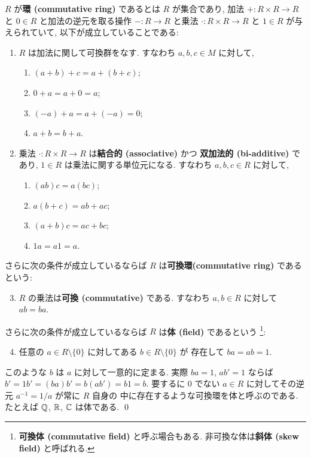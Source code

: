 \documentclass[12pt,twoside]{jarticle}
\begin{document}
\begin{definition}[可換環と体]
  \label{def:ring-field}
  $R$ が{\bf 環 (commutative ring)} であるとは $R$ が集合であり,
  加法 $+:R\times R\to R$
  と $0\in R$
  と加法の逆元を取る操作 $-:R\to R$
  と乗法 $\cdot:R\times R\to R$
  と $1\in R$ が与えられていて,
  以下が成立していることである:
  \begin{enumerate}
  \item $R$ は加法に関して可換群をなす. すなわち $a,b,c\in M$ に対して,
    \begin{enumerate}
    \item $(a + b) + c = a + (b + c)$;
    \item $0 + a = a + 0 = a$;
    \item $(-a) + a = a + (-a) = 0$;
    \item $a + b = b + a$.
    \end{enumerate}
  \item 乗法 $\cdot:R\times R\to R$ は{\bf 結合的 (associative)} かつ
    {\bf 双加法的 (bi-additive)} であり, $1\in R$ は乗法に関する単位元になる.
    すなわち $a,b,c\in R$ に対して,
    \begin{enumerate}
    \item $(ab)c = a(bc)$;
    \item $a(b + c) = ab + ac$;
    \item $(a + b)c = ac + bc$;
    \item $1a = a1 = a$.
    \end{enumerate}
  \end{enumerate}
  さらに次の条件が成立しているならば $R$ は{\bf 可換環(commutative ring)} 
  であるという:
  \begin{enumerate}
    \setcounter{enumi}{2}
  \item $R$ の乗法は{\bf 可換 (commutative)} である. 
    すなわち $a,b\in R$ に対して $ab=ba$.
  \end{enumerate}
  さらに次の条件が成立しているならば $R$ は{\bf 体 (field)} であるという%
  \footnote{{\bf 可換体 (commutative field)} と呼ぶ場合もある.
    非可換な体は{\bf 斜体 (skew field)} と呼ばれる.}:
  \begin{enumerate}
    \setcounter{enumi}{3}
  \item 任意の $a\in R\setminus\{0\}$ に対してある $b\in R\setminus\{0\}$ が
    存在して $ba = ab = 1$.
  \end{enumerate}
  このような $b$ は $a$ に対して一意的に定まる. 
  実際 $ba=1$, $ab'=1$ ならば $b'=1b'=(ba)b'=b(ab')=b1=b$.
  要するに $0$ でない $a\in R$ に対してその逆元 $a^{-1}=1/a$ が常に $R$ 自身の
  中に存在するような可換環を体と呼ぶのである.
  たとえば ${\mathbb Q}$, ${\mathbb R}$, ${\mathbb C}$ は体である.
  \qed
\end{definition}
\end{document}
